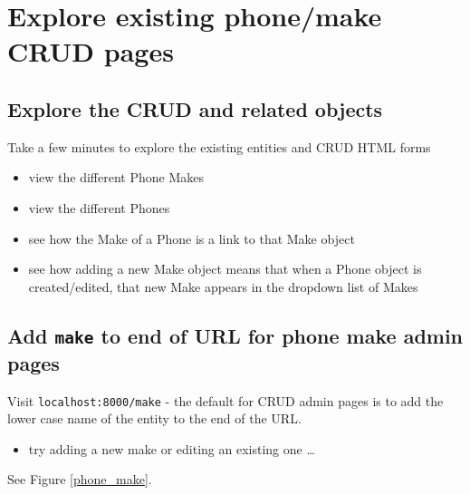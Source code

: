 \documentclass[a4paperpaper,openright]{book}
\providecommand{\tightlist}{%
  \setlength{\itemsep}{0pt}\setlength{\parskip}{0pt}}
\begin{document}
\hypertarget{explore-existing-phonemake-crud-pages}{%
\chapter{Explore existing phone/make CRUD
pages}\label{explore-existing-phonemake-crud-pages}}

\hypertarget{explore-the-crud-and-related-objects}{%
\section{Explore the CRUD and related
objects}\label{explore-the-crud-and-related-objects}}

Take a few minutes to explore the existing entities and CRUD HTML forms

\begin{itemize}
\tightlist
\item
  view the different Phone Makes
\item
  view the different Phones
\item
  see how the Make of a Phone is a link to that Make object
\item
  see how adding a new Make object means that when a Phone object is
  created/edited, that new Make appears in the dropdown list of Makes
\end{itemize}

\newpage

\hypertarget{add-make-to-end-of-url-for-phone-make-admin-pages}{%
\section{\texorpdfstring{Add \texttt{make} to end of URL for phone make
admin
pages}{Add make to end of URL for phone make admin pages}}\label{add-make-to-end-of-url-for-phone-make-admin-pages}}

Visit \texttt{localhost:8000/make} - the default for CRUD admin pages is
to add the lower case name of the entity to the end of the URL.

\begin{itemize}
\tightlist
\item
  try adding a new make or editing an existing one \ldots{}
\end{itemize}

See Figure \ref{phone_make}.
\end{document}
